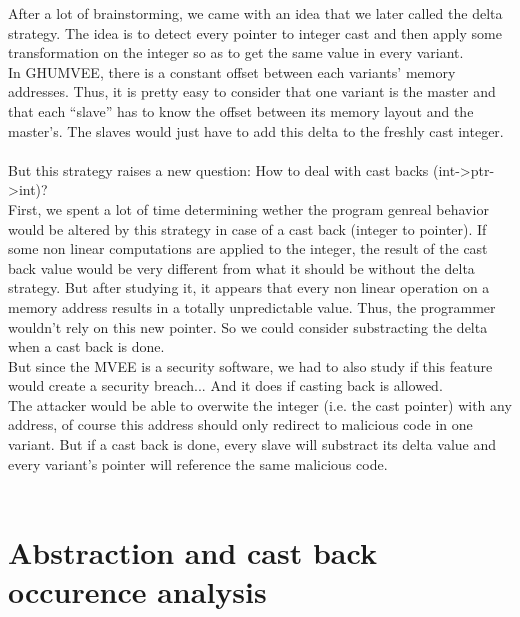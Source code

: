 \documentclass[english]{enstaPRE}
\begin{document}
After a lot of brainstorming, we came with an idea that we later called the delta strategy.
The idea is to detect every pointer to integer cast and then apply some transformation on the integer so as to get the same value
in every variant. \\
In GHUMVEE, there is a constant offset between each variants' memory addresses. Thus, it is pretty easy to consider that one
variant is the master and that each ``slave'' has to know the offset between its memory layout and the master's.
The slaves would just have to add this delta to the freshly cast integer. \\ 
 \\
But this strategy raises a new question: How to deal with cast backs (int->ptr->int)? \\ First, we spent a lot of time determining wether the program
genreal behavior would be altered by this strategy in case of a cast back (integer to pointer). If some non linear computations
are applied to the integer, the result of the cast back value would be very different from what it should be without the delta 
strategy. But after studying it, it appears that every non linear operation on a memory address results in a totally unpredictable
value. Thus, the programmer wouldn't rely on this new pointer. So we could consider substracting the delta when a cast back is done. \\
But since the MVEE is a security software, we had to also study if this feature would create a security breach... And it does if casting
back is allowed. \\ The attacker would be able to overwite the integer (i.e. the cast pointer) with any address, of course
this address should only redirect to malicious code in one variant. But if a cast back is done, every slave will substract its delta
value and every variant's pointer will reference the same malicious code. \\ 
 \\

\section{Abstraction and cast back occurence analysis}
\end{document}
